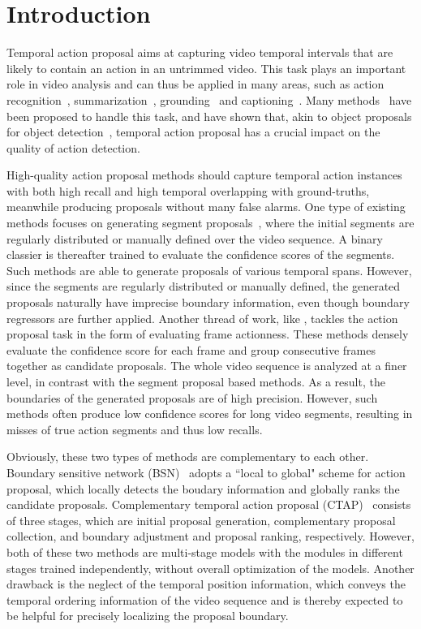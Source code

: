 \documentclass[10pt,twocolumn,letterpaper]{article}
\begin{document}
\section{Introduction}
Temporal action proposal \cite{turn_tap,dap} aims at capturing video temporal intervals that are likely to contain an action in an untrimmed video. This task plays an important role in video analysis and can thus be applied in many areas, such as 
action recognition~\cite{wenbing,jiang2015human,jiang2012trajectory-based,cao2013mining}, 
summarization~\cite{highlight,summar}, grounding~\cite{chen2018temporally,chen2019localizing} and  captioning~\cite{wang2018bidirectional,wang2018reconstruction}. Many methods~\cite{TAG,ctap} have been proposed to handle this task, and have shown that, akin to object proposals for object detection~\cite{faster_rcnn}, temporal action proposal has a crucial impact on the quality of action detection. 

High-quality action proposal methods should capture temporal action instances with both high  recall and high temporal overlapping with ground-truths, meanwhile producing proposals without many false alarms.
One type of existing methods focuses on generating segment proposals~\cite{shou_action,turn_tap}, where the initial segments are regularly distributed or manually defined over the video sequence. A binary classier is thereafter trained to evaluate the confidence scores of the segments. Such methods are able to generate proposals of various temporal spans. However, since the segments are regularly distributed or manually defined, the generated proposals naturally have  imprecise boundary information, even though boundary regressors are further applied. Another thread of work, like \cite{TAG,cdc,sms}, tackles the action proposal task in the form of evaluating frame actionness. These methods densely evaluate the confidence score for each frame and group consecutive frames together as candidate proposals. 
The whole video sequence is analyzed at a finer level, in contrast with the segment proposal based methods. As a result,  the boundaries of the generated proposals are of high precision. However, such methods often produce low confidence scores for long video segments, resulting in misses of true action segments and thus low recalls.

Obviously, these two types of methods are complementary to each other. Boundary sensitive network (BSN)~\cite{bsn} adopts a ``local to global" scheme for action proposal, which locally detects the boudary information and globally ranks the candidate proposals. Complementary temporal action proposal (CTAP)~\cite{ctap}   consists of three stages, which are initial proposal generation, complementary
proposal collection, and boundary adjustment and proposal ranking, respectively.
However,
both of these two methods are multi-stage models with the modules in
different stages trained independently, without overall
optimization of  the models. Another drawback is the neglect of the temporal position information, which conveys the temporal ordering information of the video sequence and is thereby expected to be helpful for precisely localizing the proposal boundary. 
\end{document}
